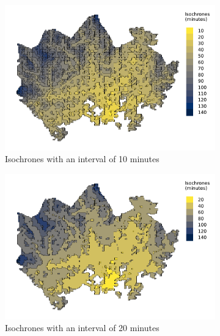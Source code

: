 \begin{figure}[H]
	\centering
	\begin{subfigure}[b]{0.5\textwidth}
		\centering
		\includegraphics[width=\textwidth]{visual/figures/ttm/isochrone_interval_10}
		\caption{Isochrones with an interval of 10 minutes}
		\label{fig:interval 10}
	\end{subfigure}%
	\hfill
	\begin{subfigure}[b]{0.5\textwidth}
		\centering
		\includegraphics[width=\textwidth]{visual/figures/ttm/isochrone_interval_20}
		\caption{Isochrones with an interval of 20 minutes}
		\label{fig:interval 20}
	\end{subfigure}%
	\hfill
	\begin{subfigure}[b]{0.5\textwidth}
		\centering

\end{subfigure}
\end{figure}
